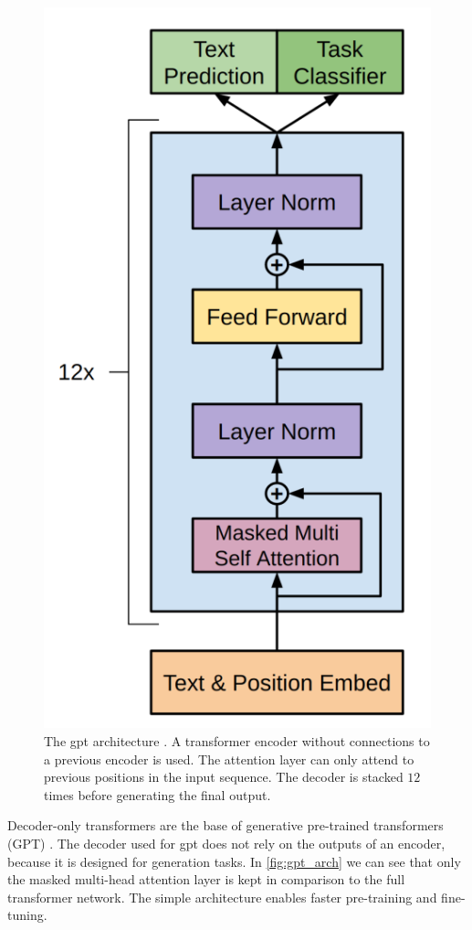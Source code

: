 \documentclass[../main.tex]{subfiles}
\begin{document}
\begin{figure}[t]
    \centering
    \includegraphics[scale=0.3]{include/images/gpt_architecture.png}
    \caption{
        The \gls{gpt} architecture \cite{Radford2018}.
        A transformer encoder
        without connections to a previous encoder is used.
        The attention layer
        can only attend to previous positions in the input sequence.
        The decoder is stacked $12$ times before generating the final output.
    }
    \label{fig:gpt_arch}
\end{figure}


Decoder-only transformers are the base of generative pre-trained transformers (GPT) \cite{Radford2018}.
The decoder used for \gls{gpt} does not rely on the outputs of an encoder,
because it is designed for generation tasks.
In \autoref{fig:gpt_arch} we can see
that only the masked multi-head attention layer is kept in comparison to
the full transformer network.
The simple architecture enables faster pre-training and fine-tuning.
\end{document}
